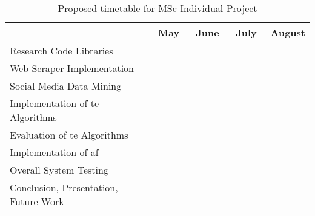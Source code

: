 \begin{table}[!htbp]
    \centering
    \begin{tabular}{|l|c|c|c|c|c|c|c|c|c|c|c|c|c|c|c|c|}
        \toprule
        & \multicolumn{4}{c|}{May} & \multicolumn{4}{c|}{June} & \multicolumn{4}{c|}{July} & \multicolumn{4}{c|}{August} \\ 
        \midrule
        
        Research Code Libraries & \multicolumn{2}{c|}{\cellcolor{brown}} & & & & & & & & & & & & & & \\
        \hline
        Web Scraper Implementation & & & \multicolumn{2}{c|}{\cellcolor{blue}} & & & & & & & & & & & & \\
        \hline
        
        Social Media Data Mining & & & & & \multicolumn{3}{c|}{\cellcolor{orange}} & & & & & & & & & \\
        \hline
        
        Implementation of \gls{te} Algorithms & & & & & & & & \multicolumn{2}{c|}{\cellcolor{green}} & & & & & & & \\
        \hline
        
        Evaluation of \gls{te} Algorithms & & & & & & & & & & \cellcolor{red} & & & & & & \\
        \hline
        
        Implementation of \gls{af} & & & & & & & & & & & \multicolumn{2}{c|}{\cellcolor{gray}} & & & & \\
        \hline
        
        Overall System Testing & & & & & & & & & & & & & \cellcolor{yellow} & & & \\
        \hline
        
        Conclusion, Presentation, Future Work & & & & & & & & & & & & & & \multicolumn{2}{c|}{\cellcolor{purple}} & \\
        \bottomrule
    \end{tabular}
    \caption{Proposed timetable for MSc Individual Project}
    \label{table:timetable}
\end{table}